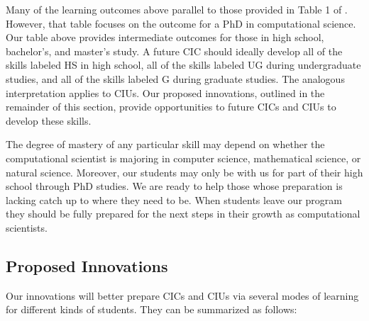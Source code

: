 \documentclass[11pt]{NSFamsart}
\begin{document}
Many of the learning outcomes above parallel to those provided in Table 1 of \cite{RudEtal18a}. However, that table focuses on the outcome for a PhD in computational science.  Our table above provides intermediate outcomes for those in high school, bachelor's, and master's study.  A future CIC should ideally develop all of the skills labeled HS in high school, all of the skills labeled UG during undergraduate studies, and all of the skills labeled G during graduate studies.  The analogous interpretation applies to CIUs.  Our proposed innovations, outlined in the remainder of this section, provide opportunities to future CICs and CIUs to develop these skills.  

The degree of mastery of any particular skill may depend on whether the computational scientist is majoring in computer science, mathematical science, or natural science.  Moreover, our students may only be with us for part of their high school through PhD studies.  We are ready to help those whose preparation is lacking catch up to where they need to be.  When students leave our program they should be fully prepared for the next steps in their growth as computational scientists.

\subsection{Proposed Innovations}
\newcommand{\CampName}{Summer computational science course}
\newcommand{\CurrExistName}{Enriched existing computational science offerings}
\newcommand{\RelSoftName}{Professional practices for computational science course} 
\newcommand{\UGradParallelName}{Undergraduate parallel and distributed computing course}
\newcommand{\LargeSCName}{Large-scale scientific computation course}
\newcommand{\PhyChemBioCompSciName}{New computational natural sciences course}
\newcommand{\CODSummerName}{Research experiences for under-served undergraduates (REUU)}
\newcommand{\FellowName}{CISC undergraduate and graduate summer fellowships}

Our innovations will better prepare CICs and CIUs via several modes of learning for different kinds of students.  They can be summarized as follows:
\end{document}
